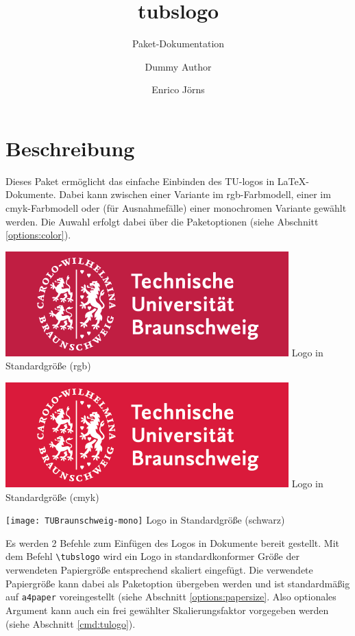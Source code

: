 \documentclass{scrartcl}
\title{tubslogo}
\subtitle{Paket-Dokumentation}
\author{Dummy Author \and Enrico Jörns}
\begin{document}
\maketitle

\section{Beschreibung}

Dieses Paket ermöglicht das einfache Einbinden des TU-logos in \LaTeX-Dokumente.
Dabei kann zwischen einer Variante im rgb-Farbmodell, einer im
cmyk-Farbmodell oder (für Ausnahmefälle) einer monochromen Variante gewählt
werden. Die Auwahl erfolgt dabei über die Paketoptionen
(siehe Abschnitt \ref{options:color}).

\begin{minipage}{0.5\textwidth}
  \centering
  \includegraphics[width=\tulogoBaseWidth]{TUBraunschweig-rgb}
  {\sffamily Logo in Standardgröße (rgb)}
\end{minipage}
\begin{minipage}{0.5\textwidth}
  \centering
  \includegraphics[width=\tulogoBaseWidth]{TUBraunschweig-cmyk}
  {\sffamily Logo in Standardgröße (cmyk)}
\end{minipage}

\begin{minipage}{0.5\textwidth}
  \centering
  \texttt{[image: TUBraunschweig-mono]}
  {\sffamily Logo in Standardgröße (schwarz)}
\end{minipage}

Es werden 2 Befehle zum Einfügen des Logos in Dokumente bereit gestellt.
Mit dem Befehl {\color{tuRed}\lstinline{\tubslogo}} wird ein Logo in
standardkonformer Größe der verwendeten Papiergröße entsprechend skaliert
eingefügt. Die verwendete Papiergröße kann dabei als Paketoption übergeben
werden und ist standardmäßig auf \lstinline{a4paper} voreingestellt
(siehe Abschnitt \ref{options:papersize}.
Also optionales Argument kann auch ein frei gewählter Skalierungsfaktor
vorgegeben werden (siehe Abschnitt \ref{cmd:tulogo}).
\end{document}
